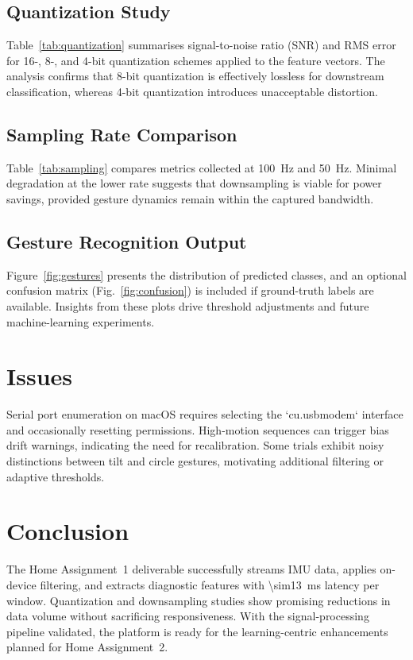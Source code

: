 \documentclass[conference]{IEEEtran}
\begin{document}
\subsection{Quantization Study}
Table~\ref{tab:quantization} summarises signal-to-noise ratio (SNR) and RMS error for 16-, 8-, and 4-bit quantization schemes applied to the feature vectors. The analysis confirms that 8-bit quantization is effectively lossless for downstream classification, whereas 4-bit quantization introduces unacceptable distortion.

\subsection{Sampling Rate Comparison}
Table~\ref{tab:sampling} compares metrics collected at \SI{100}{\hertz} and \SI{50}{\hertz}. Minimal degradation at the lower rate suggests that downsampling is viable for power savings, provided gesture dynamics remain within the captured bandwidth.

\subsection{Gesture Recognition Output}
Figure~\ref{fig:gestures} presents the distribution of predicted classes, and an optional confusion matrix (Fig.~\ref{fig:confusion}) is included if ground-truth labels are available. Insights from these plots drive threshold adjustments and future machine-learning experiments.

\section{Issues}
Serial port enumeration on macOS requires selecting the `cu.usbmodem` interface and occasionally resetting permissions. High-motion sequences can trigger bias drift warnings, indicating the need for recalibration. Some trials exhibit noisy distinctions between tilt and circle gestures, motivating additional filtering or adaptive thresholds.

\section{Conclusion}
The Home Assignment~1 deliverable successfully streams IMU data, applies on-device filtering, and extracts diagnostic features with \SI{\sim13}{\milli\second} latency per window. Quantization and downsampling studies show promising reductions in data volume without sacrificing responsiveness. With the signal-processing pipeline validated, the platform is ready for the learning-centric enhancements planned for Home Assignment~2.
\end{document}
